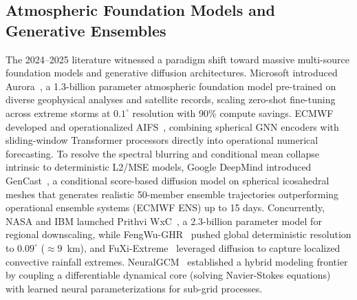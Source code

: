 \subsection{Atmospheric Foundation Models and Generative Ensembles}
The 2024--2025 literature witnessed a paradigm shift toward massive multi-source foundation models and generative diffusion architectures. Microsoft introduced Aurora~\cite{bodnar2024aurora}, a 1.3-billion parameter atmospheric foundation model pre-trained on diverse geophysical analyses and satellite records, scaling zero-shot fine-tuning across extreme storms at $0.1^\circ$ resolution with 90\% compute savings. ECMWF developed and operationalized AIFS~\cite{lang2024aifs}, combining spherical GNN encoders with sliding-window Transformer processors directly into operational numerical forecasting. To resolve the spectral blurring and conditional mean collapse intrinsic to deterministic L2/MSE models, Google DeepMind introduced GenCast~\cite{price2024gencast}, a conditional score-based diffusion model on spherical icosahedral meshes that generates realistic 50-member ensemble trajectories outperforming operational ensemble systems (ECMWF ENS) up to 15 days. Concurrently, NASA and IBM launched Prithvi WxC~\cite{schmude2024prithvi}, a 2.3-billion parameter model for regional downscaling, while FengWu-GHR~\cite{han2024fengwu_ghr} pushed global deterministic resolution to $0.09^\circ$ ($\approx 9$~km), and FuXi-Extreme~\cite{zhong2024fuxi_extreme} leveraged diffusion to capture localized convective rainfall extremes. NeuralGCM~\cite{kochkov2024neuralgcm} established a hybrid modeling frontier by coupling a differentiable dynamical core (solving Navier-Stokes equations) with learned neural parameterizations for sub-grid processes.

